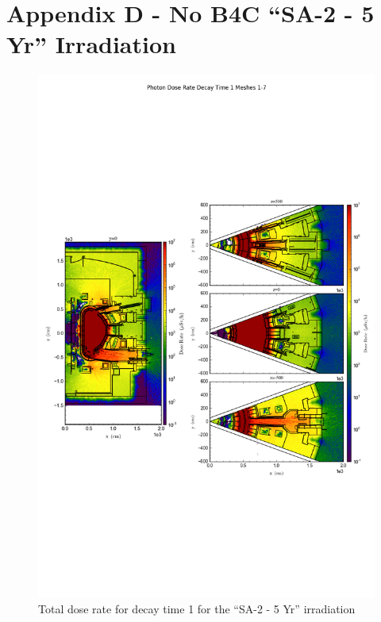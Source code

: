 \documentclass[12pt]{article}
\begin{document}
\section{Appendix D - No B4C ``SA-2 - 5 Yr'' Irradiation}
\begin{figure}[ht!]
\centering
\includegraphics[trim={0cm 8cm, 0cm 8cm},clip,scale=0.75]{../plots/final_model/10year/Photon_Dose_Rate_Decay_Time_1_Meshes_1-7.png}
\caption{Total dose rate for decay time 1 for the ``SA-2 - 5 Yr'' irradiation}
\label{fig:photons_10y_dc1_nob4c_dose}
\end{figure}
\end{document}

